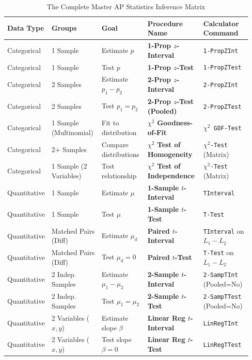 \begin{table}[H]
\centering
\scriptsize
\begin{tabular}{@{}llllp{1.8in}@{}}
\toprule
\textbf{Data Type} & \textbf{Groups} & \textbf{Goal} & \textbf{Procedure Name} & \textbf{Calculator Command} \\
\midrule
Categorical & 1 Sample & Estimate $p$ & \textbf{1-Prop $z$-Interval} & \texttt{1-PropZInt} \\
Categorical & 1 Sample & Test $p$ & \textbf{1-Prop $z$-Test} & \texttt{1-PropZTest} \\
Categorical & 2 Samples & Estimate $p_1 - p_2$ & \textbf{2-Prop $z$-Interval} & \texttt{2-PropZInt} \\
Categorical & 2 Samples & Test $p_1 = p_2$ & \textbf{2-Prop $z$-Test (Pooled)} & \texttt{2-PropZTest} \\
Categorical & 1 Sample (Multinomial) & Fit to distribution & \textbf{$\chi^2$ Goodness-of-Fit} & \texttt{$\chi^2$ GOF-Test} \\
Categorical & 2+ Samples & Compare distributions & \textbf{$\chi^2$ Test of Homogeneity} & \texttt{$\chi^2$-Test} (Matrix) \\
Categorical & 1 Sample (2 Variables) & Test relationship & \textbf{$\chi^2$ Test of Independence} & \texttt{$\chi^2$-Test} (Matrix) \\
\midrule
Quantitative & 1 Sample & Estimate $\mu$ & \textbf{1-Sample $t$-Interval} & \texttt{TInterval} \\
Quantitative & 1 Sample & Test $\mu$ & \textbf{1-Sample $t$-Test} & \texttt{T-Test} \\
Quantitative & Matched Pairs (Diff) & Estimate $\mu_d$ & \textbf{Paired $t$-Interval} & \texttt{TInterval} on $L_1 - L_2$ \\
Quantitative & Matched Pairs (Diff) & Test $\mu_d = 0$ & \textbf{Paired $t$-Test} & \texttt{T-Test} on $L_1 - L_2$ \\
Quantitative & 2 Indep. Samples & Estimate $\mu_1 - \mu_2$ & \textbf{2-Sample $t$-Interval} & \texttt{2-SampTInt} (Pooled=No) \\
Quantitative & 2 Indep. Samples & Test $\mu_1 = \mu_2$ & \textbf{2-Sample $t$-Test} & \texttt{2-SampTTest} (Pooled=No) \\
Quantitative & 2 Variables ($x, y$) & Estimate slope $\beta$ & \textbf{Linear Reg $t$-Interval} & \texttt{LinRegTInt} \\
Quantitative & 2 Variables ($x, y$) & Test slope $\beta = 0$ & \textbf{Linear Reg $t$-Test} & \texttt{LinRegTTest} \\
\bottomrule
\end{tabular}
\caption{The Complete Master AP Statistics Inference Matrix}
\end{table}
